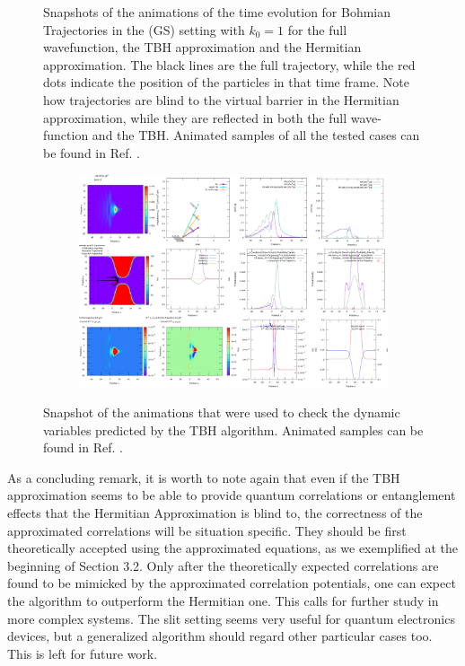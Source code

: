 \documentclass[11pt, a4paper]{article} %
\begin{document}
\begin{figure}[h!]
  \caption{ Snapshots of the animations of the time evolution for Bohmian Trajectories in the (GS) setting with $k_0=1$ for the full wavefunction, the TBH approximation and the Hermitian approximation. The black lines are the full trajectory, while the red dots indicate the position of the particles in that time frame. Note how trajectories are blind to the virtual barrier in the Hermitian approximation, while they are reflected in both the full wave-function and the TBH. Animated samples of all the tested cases can be found in Ref. \cite{DATA}.}
  \label{fig:trajs}
\end{figure}

\begin{figure}[h!]
  \centering
  \begin{subfigure}[b]{1.0\linewidth}
    \includegraphics[width=\linewidth]{screenshoot.png}
  \end{subfigure}  
  \caption{ Snapshot of the animations that were used to check the dynamic variables predicted by the TBH algorithm. Animated samples can be found in Ref. \cite{DATA}. }
  \label{fig:screenshoot}
\end{figure}
\vspace{+0.4cm}
As a concluding remark, it is worth to note again that even if the TBH approximation seems to be able to provide quantum correlations or entanglement effects that the Hermitian Approximation is blind to, the correctness of the approximated correlations will be situation specific. They should be first theoretically accepted using the approximated equations, as we exemplified at the beginning of Section 3.2. Only after the theoretically expected correlations are found to be mimicked by the approximated correlation potentials, one can expect the algorithm to outperform the Hermitian one. This calls for further study in more complex systems. The slit setting seems very useful for quantum electronics devices, but a generalized algorithm should regard other particular cases too. This is left for future work.
\end{document}
